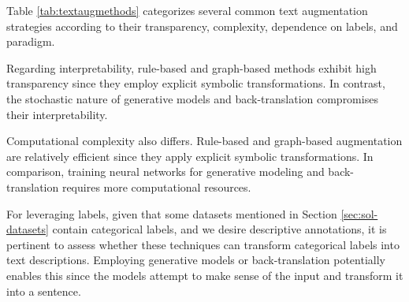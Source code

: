 Table \ref{tab:textaugmethods} categorizes several common text augmentation strategies according to their transparency, complexity, dependence on labels, and paradigm.  

Regarding interpretability, rule-based and graph-based methods exhibit high transparency since they employ explicit symbolic transformations. In contrast, the stochastic nature of generative models and back-translation compromises their interpretability.

Computational complexity also differs. Rule-based and graph-based augmentation are relatively efficient since they apply explicit symbolic transformations. In comparison, training neural networks for generative modeling and back-translation requires more computational resources.

For leveraging labels, given that some datasets mentioned in Section \ref{sec:sol-datasets} contain categorical labels, and we desire descriptive annotations, it is pertinent to assess whether these techniques can transform categorical labels into text descriptions. Employing generative models or back-translation potentially enables this since the models attempt to make sense of the input and transform it into a sentence.